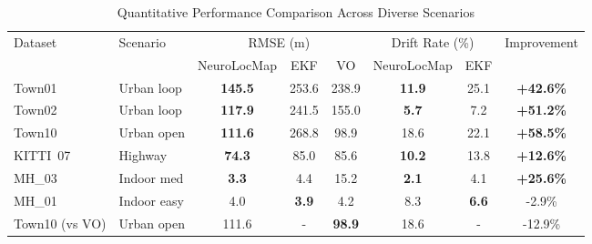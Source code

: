 \begin{table}[!t]
    \centering
    \setlength{\tabcolsep}{3pt}
    \footnotesize
    \caption{Quantitative Performance Comparison Across Diverse Scenarios}
    \label{tab:results}
    \begin{threeparttable}
        \begin{tabular}{@{}llcccccc@{}}
            \toprule
            \multirow{2}{*}{Dataset} & \multirow{2}{*}{Scenario} & \multicolumn{3}{c}{RMSE (m)} & \multicolumn{2}{c}{Drift Rate (\%)} & \multirow{2}{*}{Improvement}                                                   \\
            \cmidrule(lr){3-5} \cmidrule(lr){6-7}
                                     &                           & NeuroLocMap                  & EKF                                 & VO                           & NeuroLocMap   & EKF          &                  \\
            \midrule
            Town01                   & Urban loop                & \textbf{145.5}               & 253.6                               & 238.9                        & \textbf{11.9} & 25.1         & \textbf{+42.6\%} \\
            Town02                   & Urban loop                & \textbf{117.9}               & 241.5                               & 155.0                        & \textbf{5.7}  & 7.2          & \textbf{+51.2\%} \\
            Town10                   & Urban open                & \textbf{111.6}               & 268.8                               & 98.9                         & 18.6          & 22.1         & \textbf{+58.5\%} \\
            KITTI~07                 & Highway                   & \textbf{74.3}                & 85.0                                & 85.6                         & \textbf{10.2} & 13.8         & \textbf{+12.6\%} \\
            MH\_03                   & Indoor med                & \textbf{3.3}                 & 4.4                                 & 15.2                         & \textbf{2.1}  & 4.1          & \textbf{+25.6\%} \\
            \midrule
            MH\_01                   & Indoor easy               & 4.0                          & \textbf{3.9}                        & 4.2                          & 8.3           & \textbf{6.6} & -2.9\%           \\
            Town10 (vs VO)           & Urban open                & 111.6                        & -                                   & \textbf{98.9}                & 18.6          & -            & -12.9\%          \\

\end{tabular}
\end{threeparttable}
\end{table}
